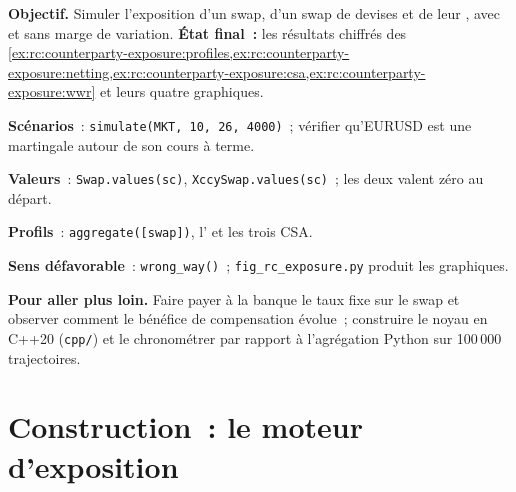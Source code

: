 \begin{tutorial}
\textbf{Objectif.} Simuler l'exposition d'un swap, d'un swap de devises et de leur ,
avec et sans marge de variation. \textbf{État final~:} les résultats chiffrés des
\cref{ex:rc:counterparty-exposure:profiles,ex:rc:counterparty-exposure:netting,ex:rc:counterparty-exposure:csa,ex:rc:counterparty-exposure:wwr}
et leurs quatre graphiques.
\begin{tutsteps}
\item \textbf{Scénarios}~: \texttt{simulate(MKT, 10, 26, 4000)}~; vérifier qu'EURUSD est une
martingale autour de son cours à terme.
\item \textbf{Valeurs}~: \texttt{Swap.values(sc)}, \texttt{XccySwap.values(sc)}~; les deux
valent zéro au départ.
\item \textbf{Profils}~: \texttt{aggregate([swap])}, l' et les trois CSA.
\item \textbf{Sens défavorable}~: \texttt{wrong\_way()}~; \texttt{fig\_rc\_exposure.py} produit les graphiques.
\end{tutsteps}
\textbf{Pour aller plus loin.} Faire payer à la banque le taux fixe sur le swap et observer comment le bénéfice de compensation
évolue~; construire le noyau en C++20 (\texttt{cpp/}) et le chronométrer par rapport à
l'agrégation Python sur 100\,000 trajectoires.
\end{tutorial}

\section{Construction~: le moteur d'exposition}\label{bld:rc:counterparty-exposure:exposure}

